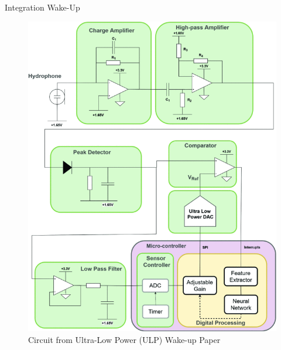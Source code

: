 \begin{frame}{Integration Wake-Up}
    \begin{figure}
        \begin{columns}
            \begin{column}{0.4\textwidth}
                \includegraphics[height=0.7\textheight,width=1\textwidth,keepaspectratio]{images/system.png}
            \end{column}
        \end{columns}
        \caption{Circuit from Ultra-Low Power (ULP) Wake-up Paper}
    \end{figure}
\end{frame}

